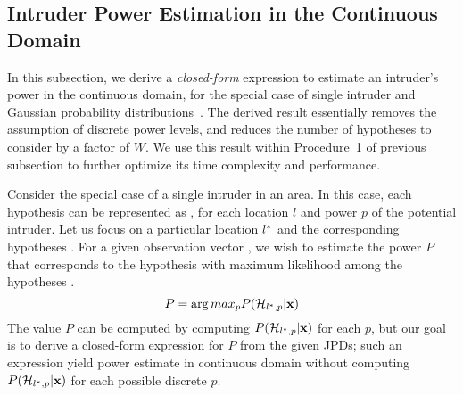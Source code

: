 \subsection{Intruder Power Estimation in the Continuous Domain}
\label{sec:power}

In this subsection, we derive a {\em closed-form} expression to estimate an
intruder's power in the continuous domain, for the special case of
single intruder and Gaussian probability
distributions~\cite{gauss}. The derived result essentially removes the
assumption of discrete power levels, and reduces the number of
hypotheses to consider by a factor of $W$. We use
this result within Procedure~1 of previous subsection to further
optimize its time complexity and performance.

  Consider the
special case of a single intruder in an area. In this case, each
hypothesis can be represented as \hlp, for each location $l$ and power
$p$ of the potential intruder. Let us focus on a particular location
$l^*$ and the corresponding hypotheses \hLp. 
For a given observation vector \vx, we wish to estimate the power $P$
that corresponds to the hypothesis with maximum likelihood among the
hypotheses \hLp.
$$P = \arg max_p P(\mathcal{H}_{l^*,p} | \mathbf{x})$$
The value $P$ can be computed by computing $P(\mathcal{H}_{l^*,p} | \mathbf{x})$ for
each $p$, but our goal is to derive a closed-form expression for $P$
from the given JPDs; such an expression yield power estimate in
continuous domain without computing $P(\mathcal{H}_{l^*,p} | \mathbf{x})$ for each possible
discrete $p$.


